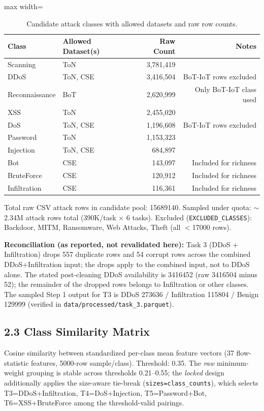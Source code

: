 \documentclass[11pt,a4paper]{article}
\begin{document}
\begin{table}[H]
\centering
\caption{Candidate attack classes with allowed datasets and raw row counts.}
\label{tab:candidate-classes}
\begin{adjustbox}{max width=\textwidth}
\begin{tabular}{llrr}
\toprule
Class & Allowed Dataset(s) & Raw Count & Notes \\
\midrule
Scanning & ToN & 3,781,419 & \\
DDoS & ToN, CSE & 3,416,504 & BoT-IoT rows excluded \\
Reconnaissance & BoT & 2,620,999 & Only BoT-IoT class used \\
XSS & ToN & 2,455,020 & \\
DoS & ToN, CSE & 1,196,608 & BoT-IoT rows excluded \\
Password & ToN & 1,153,323 & \\
Injection & ToN, CSE & 684,897 & \\
Bot & CSE & 143,097 & Included for richness \\
BruteForce & CSE & 120,912 & Included for richness \\
Infiltration & CSE & 116,361 & Included for richness \\
\bottomrule
\end{tabular}
\end{adjustbox}
\end{table}
Total raw CSV attack rows in candidate pool: \num{15689140}. Sampled under quota: $\sim$2.34M attack rows total (390K/task $\times$ 6 tasks). Excluded (\texttt{EXCLUDED\_CLASSES}): Backdoor, MITM, Ransomware, Web Attacks, Theft (all $<$\num{17000} rows).

\textbf{Reconciliation (as reported, not revalidated here):} Task 3 (DDoS + Infiltration) drops \num{557} duplicate rows and \num{54} corrupt rows across the combined DDoS+Infiltration input; the drops apply to the combined input, not to DDoS alone. The stated post-cleaning DDoS availability is \num{3416452} (raw \num{3416504} minus \num{52}); the remainder of the dropped rows belongs to Infiltration or other classes. The sampled Step 1 output for T3 is DDoS \num{273636} / Infiltration \num{115804} / Benign \num{129999} (verified in \texttt{data/processed/task\_3.parquet}).

\subsection*{2.3 Class Similarity Matrix}
Cosine similarity between standardized per-class mean feature vectors (37 flow-statistic features, \num{5000}-row sample/class). Threshold: \num{0.35}. The \emph{raw} minimum-weight grouping is stable across thresholds \num{0.21}--\num{0.55}; the \emph{locked} design additionally applies the size-aware tie-break (\texttt{sizes=class\_counts}), which selects T3=DDoS+Infiltration, T4=DoS+Injection, T5=Password+Bot, T6=XSS+BruteForce among the threshold-valid pairings.
\end{document}
